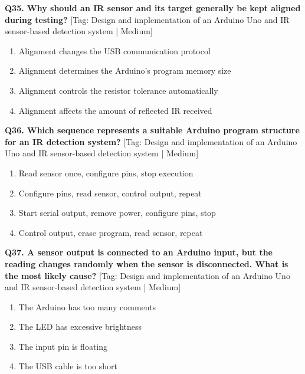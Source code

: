 \noindent\textbf{Q35. Why should an IR sensor and its target generally be kept aligned during testing?} \hfill [Tag: Design and implementation of an Arduino Uno and IR sensor-based detection system | Medium]
\begin{enumerate}[label=(\alph*),topsep=2pt,itemsep=1pt,partopsep=0pt,parsep=0pt]
    \item {Alignment changes the USB communication protocol}
    \item {Alignment determines the Arduino's program memory size}
    \item {Alignment controls the resistor tolerance automatically}
    \item {Alignment affects the amount of reflected IR received}
\end{enumerate}
\vspace{2mm}

\noindent\textbf{Q36. Which sequence represents a suitable Arduino program structure for an IR detection system?} \hfill [Tag: Design and implementation of an Arduino Uno and IR sensor-based detection system | Medium]
\begin{enumerate}[label=(\alph*),topsep=2pt,itemsep=1pt,partopsep=0pt,parsep=0pt]
    \item {Read sensor once, configure pins, stop execution}
    \item {Configure pins, read sensor, control output, repeat}
    \item {Start serial output, remove power, configure pins, stop}
    \item {Control output, erase program, read sensor, repeat}
\end{enumerate}
\vspace{2mm}

\noindent\textbf{Q37. A sensor output is connected to an Arduino input, but the reading changes randomly when the sensor is disconnected. What is the most likely cause?} \hfill [Tag: Design and implementation of an Arduino Uno and IR sensor-based detection system | Medium]
\begin{enumerate}[label=(\alph*),topsep=2pt,itemsep=1pt,partopsep=0pt,parsep=0pt]
    \item {The Arduino has too many comments}
    \item {The LED has excessive brightness}
    \item {The input pin is floating}
    \item {The USB cable is too short}
\end{enumerate}
\vspace{2mm}

